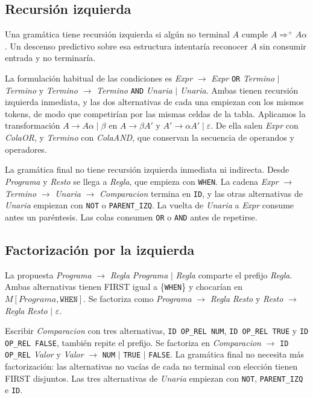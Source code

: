 \documentclass[11pt,a4paper]{article}
\newcommand{\tk}[1]{\texttt{#1}}
\newcommand{\nt}[1]{\textit{#1}}
\begin{document}
\subsection{Recursión izquierda}

Una gramática tiene recursión izquierda si algún no terminal $A$
cumple $A \Rightarrow^{+} A\alpha$. Un descenso predictivo sobre
esa estructura intentaría reconocer $A$ sin consumir entrada y no terminaría.

La formulación habitual de las condiciones es \nt{Expr} $\to$
\nt{Expr} \tk{OR} \nt{Termino} $\mid$ \nt{Termino} y \nt{Termino}
$\to$ \nt{Termino} \tk{AND} \nt{Unaria} $\mid$ \nt{Unaria}. Ambas
tienen recursión izquierda inmediata, y las dos alternativas de
cada una empiezan con los mismos tokens, de modo que competirían
por las mismas celdas de la tabla. Aplicamos la transformación $A
\to A\alpha \mid \beta$ en $A \to \beta A'$ y $A' \to \alpha A'
\mid \varepsilon$. De ella salen \nt{Expr} con \nt{ColaOR}, y
\nt{Termino} con \nt{ColaAND}, que conservan la secuencia de
operandos y operadores.

La gramática final no tiene recursión izquierda inmediata ni
indirecta. Desde \nt{Programa} y \nt{Resto} se llega a \nt{Regla},
que empieza con \tk{WHEN}. La cadena \nt{Expr} $\to$ \nt{Termino}
$\to$ \nt{Unaria} $\to$ \nt{Comparacion} termina en \tk{ID}, y las
otras alternativas de \nt{Unaria} empiezan con \tk{NOT} o
\tk{PARENT\_IZQ}. La vuelta de \nt{Unaria} a \nt{Expr} consume
antes un paréntesis. Las colas consumen \tk{OR} o \tk{AND} antes de repetirse.

\subsection{Factorización por la izquierda}

La propuesta \nt{Programa} $\to$ \nt{Regla} \nt{Programa} $\mid$
\nt{Regla} comparte el prefijo \nt{Regla}. Ambas alternativas
tienen FIRST igual a \{\tk{WHEN}\} y chocarían en $M[\nt{Programa},
\tk{WHEN}]$. Se factoriza como \nt{Programa} $\to$ \nt{Regla}
\nt{Resto} y \nt{Resto} $\to$ \nt{Regla} \nt{Resto} $\mid$ $\varepsilon$.

Escribir \nt{Comparacion} con tres alternativas, \tk{ID OP\_REL
NUM}, \tk{ID OP\_REL TRUE} y \tk{ID OP\_REL FALSE}, también repite
el prefijo. Se factoriza en \nt{Comparacion} $\to$ \tk{ID OP\_REL}
\nt{Valor} y \nt{Valor} $\to$ \tk{NUM} $\mid$ \tk{TRUE} $\mid$
\tk{FALSE}. La gramática final no necesita más factorización: las
alternativas no vacías de cada no terminal con elección tienen
FIRST disjuntos. Las tres alternativas de \nt{Unaria} empiezan con
\tk{NOT}, \tk{PARENT\_IZQ} e \tk{ID}.
\end{document}
